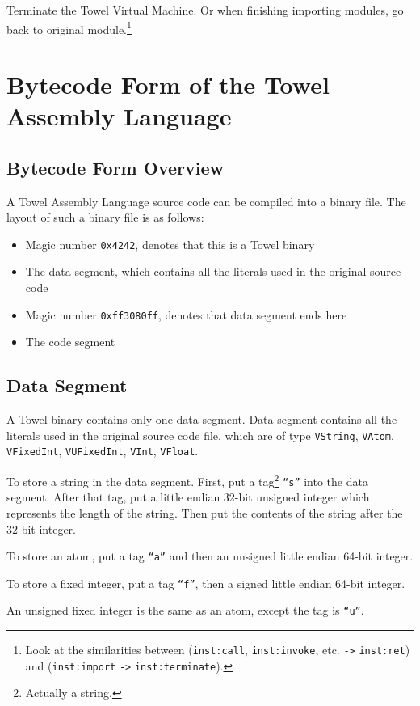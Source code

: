 \documentclass{article}
\newcommand{\inst}[1] {\texttt{inst:#1}}
\begin{document}
Terminate the Towel Virtual Machine. Or when finishing importing modules, go back to original module.\footnote{Look at the similarities between (\inst{call}, \inst{invoke}, etc. \texttt{->} \inst{ret}) and (\inst{import} \texttt{->} \inst{terminate}).}

\section{Bytecode Form of the Towel Assembly Language}

\subsection{Bytecode Form Overview}

A Towel Assembly Language source code can be compiled into a binary file. The layout of such a binary file is as follows:
\begin{itemize}
\item Magic number \texttt{0x4242}, denotes that this is a Towel binary
\item The data segment, which contains all the literals used in the original source code
\item Magic number \texttt{0xff3080ff}, denotes that data segment ends here
\item The code segment
\end{itemize}

\subsection{Data Segment}
A Towel binary contains only one data segment. Data segment contains all the literals used in the original source code file, which are of type \texttt{VString}, \texttt{VAtom}, \texttt{VFixedInt}, \texttt{VUFixedInt}, \texttt{VInt}, \texttt{VFloat}.

To store a string in the data segment. First, put a tag\footnote{Actually a string.} \texttt{``s''} into the data segment. After that tag, put a little endian 32-bit unsigned integer which represents the length of the string. Then put the contents of the string after the 32-bit integer.

To store an atom, put a tag \texttt{``a''} and then an unsigned little endian 64-bit integer.

To store a fixed integer, put a tag \texttt{``f''}, then a signed little endian 64-bit integer.

An unsigned fixed integer is the same as an atom, except the tag is \texttt{``u''}.
\end{document}

